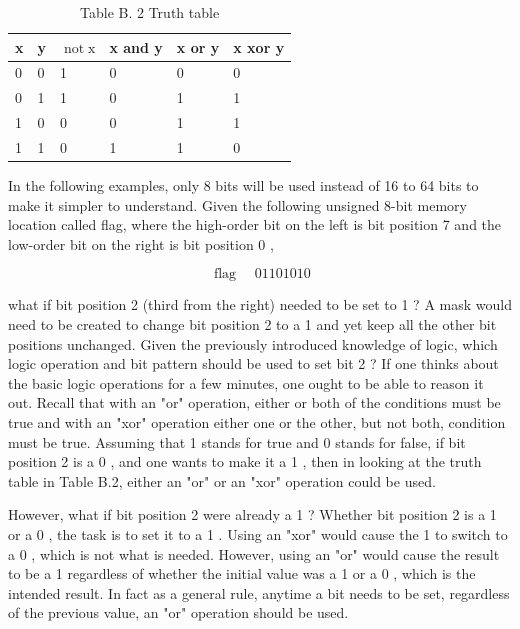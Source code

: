 \documentclass[10pt]{article}
\begin{document}
\begin{table}[h]
\begin{center}
\captionsetup{labelformat=empty}
\caption{Table B. 2 Truth table}
\begin{tabular}{|l|l|l|l|l|l|}
\hline
x & y & $\operatorname{not} \mathrm{x}$ & x and y & x or y & x xor y \\
\hline
0 & 0 & 1 & 0 & 0 & 0 \\
\hline
0 & 1 & 1 & 0 & 1 & 1 \\
\hline
1 & 0 & 0 & 0 & 1 & 1 \\
\hline
1 & 1 & 0 & 1 & 1 & 0 \\
\hline
\end{tabular}
\end{center}
\end{table}

In the following examples, only 8 bits will be used instead of 16 to 64 bits to make it simpler to understand. Given the following unsigned 8-bit memory location called flag, where the high-order bit on the left is bit position 7 and the low-order bit on the right is bit position 0 ,

$$
\text { flag } \quad 01101010
$$

what if bit position 2 (third from the right) needed to be set to 1 ? A mask would need to be created to change bit position 2 to a 1 and yet keep all the other bit positions unchanged. Given the previously introduced knowledge of logic, which logic operation and bit pattern should be used to set bit 2 ? If one thinks about the basic logic operations for a few minutes, one ought to be able to reason it out. Recall that with an "or" operation, either or both of the conditions must be true and with an "xor" operation either one or the other, but not both, condition must be true. Assuming that 1 stands for true and 0 stands for false, if bit position 2 is a 0 , and one wants to make it a 1 , then in looking at the truth table in Table B.2, either an "or" or an "xor" operation could be used.

However, what if bit position 2 were already a 1 ? Whether bit position 2 is a 1 or a 0 , the task is to set it to a 1 . Using an "xor" would cause the 1 to switch to a 0 , which is not what is needed. However, using an "or" would cause the result to be a 1 regardless of whether the initial value was a 1 or a 0 , which is the intended result. In fact as a general rule, anytime a bit needs to be set, regardless of the previous value, an "or" operation should be used.
\end{document}
